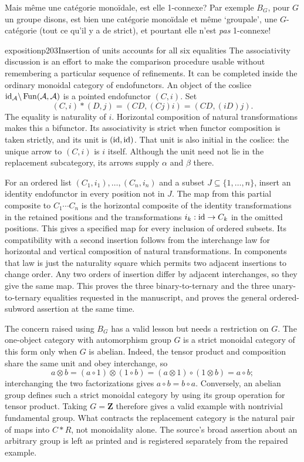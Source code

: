 Mais même une catégorie monoïdale, est elle 1-connexe? Par exemple $B_G$, pour $G$ un groupe disons, est bien une catégorie monoïdale et même ‘groupale’, une $G$-catégorie (tout ce qu'il y a de strict), et pourtant elle n'est \textit{pas} 1-connexe!

\begin{dcomment}{exposition}{p203}{Insertion of units accounts for all six equalities}
The associativity discussion is an effort to make the comparison procedure usable without remembering a particular sequence of refinements. It can be completed inside the ordinary monoidal category of endofunctors. An object of the coslice $\mathrm{id}_{\mathcal A}\backslash\operatorname{Fun}(\mathcal A,\mathcal A)$ is a pointed endofunctor $(C,i)$. Set
\[
 (C,i)*(D,j)=(CD,(Cj)i)=(CD,(iD)j).
\]
The equality is naturality of $i$. Horizontal composition of natural transformations makes this a bifunctor. Its associativity is strict when functor composition is taken strictly, and its unit is $(\mathrm{id},\mathrm{id})$. That unit is also initial in the coslice: the unique arrow to $(C,i)$ is $i$ itself. Although the unit need not lie in the replacement subcategory, its arrows supply $\alpha$ and $\beta$ there.

For an ordered list $(C_1,i_1),\ldots,(C_n,i_n)$ and a subset $J\subseteq\{1,\ldots,n\}$, insert an identity endofunctor in every position not in $J$. The map from this partial composite to $C_1\cdots C_n$ is the horizontal composite of the identity transformations in the retained positions and the transformations $i_k:\mathrm{id}\to C_k$ in the omitted positions. This gives a specified map for every inclusion of ordered subsets. Its compatibility with a second insertion follows from the interchange law for horizontal and vertical composition of natural transformations. In components that law is just the naturality square which permits two adjacent insertions to change order. Any two orders of insertion differ by adjacent interchanges, so they give the same map. This proves the three binary-to-ternary and the three unary-to-ternary equalities requested in the manuscript, and proves the general ordered-subword assertion at the same time.

The concern raised using $B_G$ has a valid lesson but needs a restriction on $G$. The one-object category with automorphism group $G$ is a strict monoidal category of this form only when $G$ is abelian. Indeed, the tensor product and composition share the same unit and obey interchange, so
\[
 a\otimes b=(a\circ1)\otimes(1\circ b)
 =(a\otimes1)\circ(1\otimes b)=a\circ b;
\]
interchanging the two factorizations gives $a\circ b=b\circ a$. Conversely, an abelian group defines such a strict monoidal category by using its group operation for tensor product. Taking $G=\mathbf Z$ therefore gives a valid example with nontrivial fundamental group. What contracts the replacement category is the natural pair of maps into $C*R$, not monoidality alone. The source's broad assertion about an arbitrary group is left as printed and is registered separately from the repaired example.
\end{dcomment}


